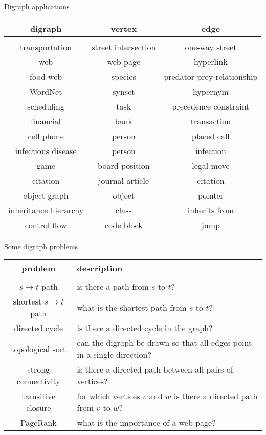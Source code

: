 \documentclass[8pt,a4paper,compress]{beamer}
\begin{document}
\begin{frame}[fragile]
Digraph applications
\begin{center}
\begin{tabular}{ccc}
digraph & vertex & edge \\ \hline \\
transportation & street intersection & one-way street \\
web & web page & hyperlink \\
food web & species & predator-prey relationship \\
WordNet & synset & hypernym \\
scheduling & task & precedence constraint \\
financial & bank & transaction \\
cell phone & person & placed call \\
infectious disease & person & infection \\
game & board position & legal move \\
citation & journal article & citation \\
object graph & object & pointer \\
inheritance hierarchy & class & inherits from \\ 
control flow & code block & jump
\end{tabular}  
\end{center}
\end{frame}

\begin{frame}[fragile]
Some digraph problems
\begin{center}
\begin{tabular}{cp{5cm}}
problem & description \\ \hline \\
$s\to t$ path & is there a path from $s$ to $t$? \\ 
shortest $s\to t$ path & what is the shortest path from $s$ to $t$? \\
directed cycle & is there a directed cycle in the graph? \\
topological sort & can the digraph be drawn so that all edges point in a single direction? \\
strong connectivity & is there a directed path between all pairs of vertices? \\
transitive closure & for which vertices $v$ and $w$ is there a directed path from $v$ to $w$? \\
PageRank & what is the importance of a web page?
\end{tabular}  
\end{center}
\end{frame}
\end{document}
